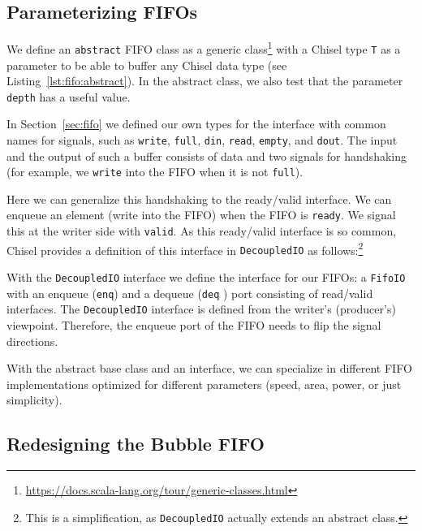 \documentclass[%
    10pt,
    headinclude, footinclude=false,
    openright, %
    notitlepage,
    cleardoublepage=empty,
    headsepline,
    numbers=noenddot,
    bibliography=totoc, index=totoc,
    ]{scrbook}
\newcommand{\code}[1]{{\lstinline[basicstyle=\small\ttfamily]{#1}}}
\newcommand{\codefoot}[1]{{\lstinline[basicstyle=\footnotesize\ttfamily]{#1}}}
\newcommand{\myref}[2]{\href{#1}{#2}}
\renewcommand{\myref}[2]{{#2}{\footnote{\url{#1}}}}
\begin{document}
\subsection{Parameterizing FIFOs}

We define an \code{abstract}
FIFO class as a \myref{https://docs.scala-lang.org/tour/generic-classes.html}{generic class}
with a Chisel type \code{T} as a parameter to be able to buffer
any Chisel data type (see Listing~\ref{lst:fifo:abstract}). In the abstract class, we also test that the
parameter \code{depth} has a useful value.


In Section~\ref{sec:fifo} we defined our own types for the interface with common
names for signals, such as \code{write}, \code{full}, \code{din}, \code{read},
\code{empty}, and \code{dout}. The input and the output of such a buffer consists
of data and two signals for handshaking (for example, we \code{write} into the FIFO when
it is not \code{full}).

Here we can generalize this handshaking to the ready/valid interface.
We can enqueue an element (write into the FIFO) when the FIFO is \code{ready}.
We signal this at the writer side with \code{valid}.
As this ready/valid interface is so common, Chisel provides a definition
of this interface in \code{DecoupledIO} as follows:\footnote{This is a simplification,
as \codefoot{DecoupledIO} actually extends an abstract class.}


\noindent With the \code{DecoupledIO} interface we define the interface for our FIFOs:
a \code{FifoIO} with an enqueue (\code{enq}) and a dequeue (\code{deq} ) port consisting
of read/valid interfaces.
 The \code{DecoupledIO} interface is defined from the writer's (producer's) viewpoint.
Therefore, the enqueue port of the FIFO needs to flip the signal directions.



With the abstract base class and an interface, we can specialize in different
FIFO implementations optimized for different parameters (speed, area, power,
or just simplicity).

\subsection{Redesigning the Bubble FIFO}
\end{document}
